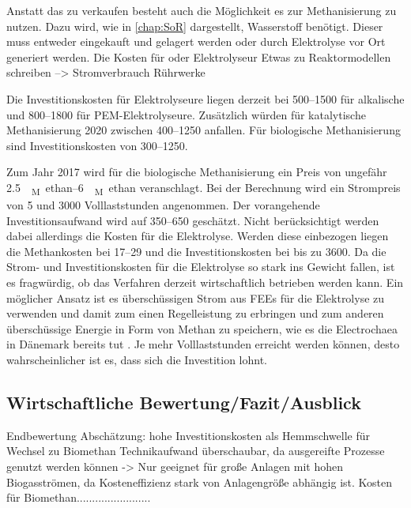 Anstatt das  zu verkaufen besteht auch die Möglichkeit es zur Methanisierung zu nutzen. Dazu wird, wie in \ref{chap:SoR} dargestellt, Wasserstoff benötigt. Dieser muss entweder eingekauft und gelagert werden oder durch Elektrolyse vor Ort generiert werden.
Die Kosten für  oder Elektrolyseur
Etwas zu Reaktormodellen schreiben --> Stromverbrauch Rührwerke

Die Investitionskosten für Elektrolyseure liegen derzeit bei \SIrange{500}{1500}{\Eurkw} für alkalische und \SIrange{800}{1800}{\Eurkw} für PEM-Elektrolyseure. Zusätzlich würden für katalytische Methanisierung \SI{2020}{\relax} zwischen \SIrange{400}{1250}{\Eurkw} anfallen. Für biologische Methanisierung sind Investitionskosten von \SIrange{300}{1250}{\Eurkw}.  \parencite{dena2018b}


Zum Jahr \SI{2017}{\relax} wird für die biologische Methanisierung ein Preis von ungefähr \SIrange{2,5}{6}{\ct\kwh_Methan} veranschlagt. 
Bei der Berechnung wird ein Strompreis von \SI{5}{\ctkwh} und \SI{3000}{\relax} Volllaststunden angenommen. Der vorangehende Investitionsaufwand wird auf \SIrange{350}{650}{\Eurkw} geschätzt. Nicht berücksichtigt werden dabei allerdings die Kosten für die Elektrolyse. Werden diese einbezogen liegen die Methankosten bei \SIrange{17}{29}{\ctkwh} und die Investitionskosten bei bis zu \SI{3600}{\Eurkw}. Da die Strom- und Investitionskosten für die Elektrolyse so stark ins Gewicht fallen, ist es fragwürdig, ob das Verfahren derzeit wirtschaftlich betrieben werden kann. Ein möglicher Ansatz ist es überschüssigen Strom aus \glspl{FEE} für die Elektrolyse zu verwenden und damit zum einen Regelleistung zu erbringen und zum anderen überschüssige Energie in Form von Methan zu speichern, wie es die Electrochaea in Dänemark bereits tut \parencite{Chaea20}. Je mehr Volllaststunden erreicht werden können, desto wahrscheinlicher ist es, dass sich die Investition lohnt.
\parencite{4.2b17} \smallskip


\subsection{Wirtschaftliche Bewertung/Fazit/Ausblick}

Endbewertung Abschätzung:
hohe Investitionskosten als Hemmschwelle für Wechsel zu Biomethan
Technikaufwand überschaubar, da ausgereifte Prozesse genutzt werden können
-> Nur geeignet für große Anlagen mit hohen Biogasströmen, da Kosteneffizienz stark von Anlagengröße abhängig ist.
Kosten für Biomethan........................